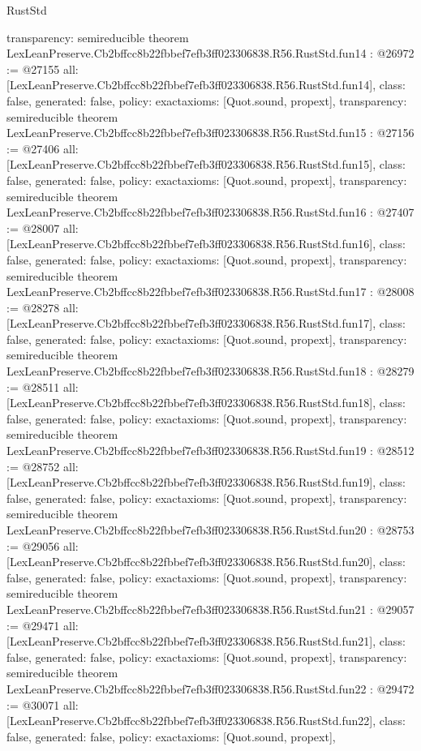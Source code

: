 \begin{lexlean}{RustStd}
\begin{coremodule}
{  transparency: semireducible
}
theorem LexLeanPreserve.Cb2bffcc8b22fbbef7efb3ff023306838.R56.RustStd.fun14 : @26972 := @27155 {
  all: [LexLeanPreserve.Cb2bffcc8b22fbbef7efb3ff023306838.R56.RustStd.fun14],
  class: false,
  generated: false,
  policy: exact{axioms: [Quot.sound, propext]},
  transparency: semireducible
}
theorem LexLeanPreserve.Cb2bffcc8b22fbbef7efb3ff023306838.R56.RustStd.fun15 : @27156 := @27406 {
  all: [LexLeanPreserve.Cb2bffcc8b22fbbef7efb3ff023306838.R56.RustStd.fun15],
  class: false,
  generated: false,
  policy: exact{axioms: [Quot.sound, propext]},
  transparency: semireducible
}
theorem LexLeanPreserve.Cb2bffcc8b22fbbef7efb3ff023306838.R56.RustStd.fun16 : @27407 := @28007 {
  all: [LexLeanPreserve.Cb2bffcc8b22fbbef7efb3ff023306838.R56.RustStd.fun16],
  class: false,
  generated: false,
  policy: exact{axioms: [Quot.sound, propext]},
  transparency: semireducible
}
theorem LexLeanPreserve.Cb2bffcc8b22fbbef7efb3ff023306838.R56.RustStd.fun17 : @28008 := @28278 {
  all: [LexLeanPreserve.Cb2bffcc8b22fbbef7efb3ff023306838.R56.RustStd.fun17],
  class: false,
  generated: false,
  policy: exact{axioms: [Quot.sound, propext]},
  transparency: semireducible
}
theorem LexLeanPreserve.Cb2bffcc8b22fbbef7efb3ff023306838.R56.RustStd.fun18 : @28279 := @28511 {
  all: [LexLeanPreserve.Cb2bffcc8b22fbbef7efb3ff023306838.R56.RustStd.fun18],
  class: false,
  generated: false,
  policy: exact{axioms: [Quot.sound, propext]},
  transparency: semireducible
}
theorem LexLeanPreserve.Cb2bffcc8b22fbbef7efb3ff023306838.R56.RustStd.fun19 : @28512 := @28752 {
  all: [LexLeanPreserve.Cb2bffcc8b22fbbef7efb3ff023306838.R56.RustStd.fun19],
  class: false,
  generated: false,
  policy: exact{axioms: [Quot.sound, propext]},
  transparency: semireducible
}
theorem LexLeanPreserve.Cb2bffcc8b22fbbef7efb3ff023306838.R56.RustStd.fun20 : @28753 := @29056 {
  all: [LexLeanPreserve.Cb2bffcc8b22fbbef7efb3ff023306838.R56.RustStd.fun20],
  class: false,
  generated: false,
  policy: exact{axioms: [Quot.sound, propext]},
  transparency: semireducible
}
theorem LexLeanPreserve.Cb2bffcc8b22fbbef7efb3ff023306838.R56.RustStd.fun21 : @29057 := @29471 {
  all: [LexLeanPreserve.Cb2bffcc8b22fbbef7efb3ff023306838.R56.RustStd.fun21],
  class: false,
  generated: false,
  policy: exact{axioms: [Quot.sound, propext]},
  transparency: semireducible
}
theorem LexLeanPreserve.Cb2bffcc8b22fbbef7efb3ff023306838.R56.RustStd.fun22 : @29472 := @30071 {
  all: [LexLeanPreserve.Cb2bffcc8b22fbbef7efb3ff023306838.R56.RustStd.fun22],
  class: false,
  generated: false,
  policy: exact{axioms: [Quot.sound, propext]},
}
\end{coremodule}
\end{lexlean}
